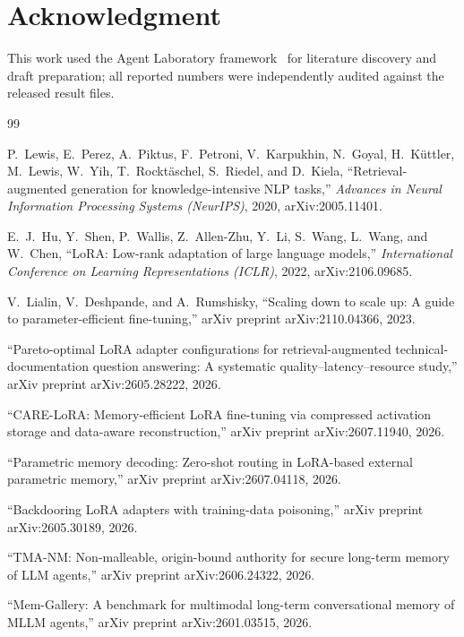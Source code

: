 \documentclass[conference]{IEEEtran}
\begin{document}
\section*{Acknowledgment}
This work used the Agent Laboratory framework~\cite{schmidgall2025agentlab} for literature discovery and draft preparation; all reported numbers were independently audited against the released result files.

\begin{thebibliography}{99}

P.~Lewis, E.~Perez, A.~Piktus, F.~Petroni, V.~Karpukhin, N.~Goyal, H.~K\"uttler, M.~Lewis, W.~Yih, T.~Rockt\"aschel, S.~Riedel, and D.~Kiela,
``Retrieval-augmented generation for knowledge-intensive NLP tasks,''
\emph{Advances in Neural Information Processing Systems (NeurIPS)}, 2020, arXiv:2005.11401.

E.~J.~Hu, Y.~Shen, P.~Wallis, Z.~Allen-Zhu, Y.~Li, S.~Wang, L.~Wang, and W.~Chen,
``LoRA: Low-rank adaptation of large language models,''
\emph{International Conference on Learning Representations (ICLR)}, 2022, arXiv:2106.09685.

V.~Lialin, V.~Deshpande, and A.~Rumshisky,
``Scaling down to scale up: A guide to parameter-efficient fine-tuning,''
arXiv preprint arXiv:2110.04366, 2023.

``Pareto-optimal LoRA adapter configurations for retrieval-augmented technical-documentation question answering: A systematic quality--latency--resource study,''
arXiv preprint arXiv:2605.28222, 2026.

``CARE-LoRA: Memory-efficient LoRA fine-tuning via compressed activation storage and data-aware reconstruction,''
arXiv preprint arXiv:2607.11940, 2026.

``Parametric memory decoding: Zero-shot routing in LoRA-based external parametric memory,''
arXiv preprint arXiv:2607.04118, 2026.

``Backdooring LoRA adapters with training-data poisoning,''
arXiv preprint arXiv:2605.30189, 2026.

``TMA-NM: Non-malleable, origin-bound authority for secure long-term memory of LLM agents,''
arXiv preprint arXiv:2606.24322, 2026.

``Mem-Gallery: A benchmark for multimodal long-term conversational memory of MLLM agents,''
arXiv preprint arXiv:2601.03515, 2026.


\end{thebibliography}
\end{document}
